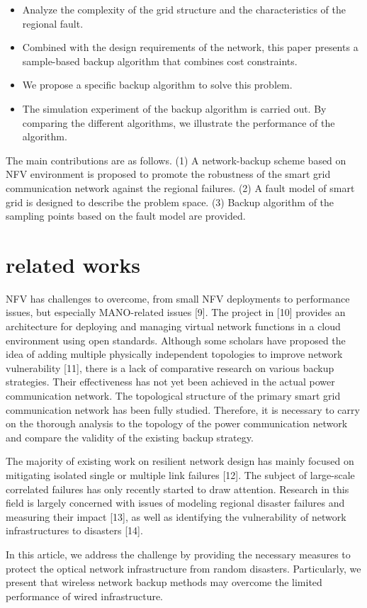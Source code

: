 \documentclass[journal]{IEEEtran}
\begin{document}
\begin{itemize}
\item Analyze the complexity of the grid structure and the characteristics of the regional fault. 
\item Combined with the design requirements of the network, this paper presents a sample-based backup algorithm that combines cost constraints.
\item We propose a specific backup algorithm to solve this problem.
\item The simulation experiment of the backup algorithm is carried out. By comparing the different algorithms, we illustrate the performance of the algorithm.
\end{itemize}
\par The main contributions are as follows. (1) A network-backup scheme based on NFV environment is proposed to promote the robustness of the smart grid communication network against the regional failures. (2) A fault model of smart grid is designed to describe the problem space. (3) Backup algorithm of the sampling points based on the fault model  are provided.


\section{related works}
\par NFV has challenges to overcome, from small NFV deployments to performance issues, but especially MANO-related issues [9]. The project in [10] provides an architecture for deploying and managing virtual network functions in a cloud environment using open standards. Although some scholars have proposed the idea of adding multiple physically independent topologies to improve network vulnerability [11], there is a lack of comparative research on various backup strategies. Their effectiveness has not yet been achieved in the actual power communication network. The topological structure of the primary smart grid communication network has been fully studied. Therefore, it is necessary to carry on the thorough analysis to the topology of the power communication network and compare the validity of the existing backup strategy.
\par The majority of existing work on resilient network design has mainly focused on mitigating isolated single or multiple link failures [12]. The subject of large-scale correlated failures has only recently started to draw attention. Research in this field is largely concerned with issues of modeling regional disaster failures and measuring their impact [13], as well as identifying the vulnerability of network infrastructures to disasters [14]. 
\par In this article, we address the challenge by providing the necessary measures to protect the optical network infrastructure from random disasters. Particularly, we present that wireless network backup methods may overcome the limited performance of wired infrastructure.
\end{document}
